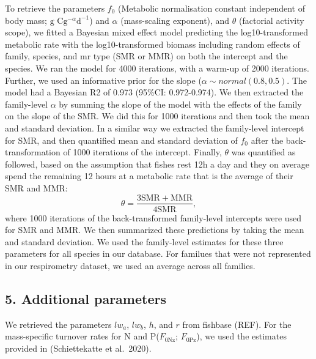 \documentclass[12pt,a4paper]{article}
\begin{document}
To retrieve the parameters \(f_\textrm{0}\) (Metabolic normalisation
constant independent of body mass;
\(\textrm{g C} \textrm{g}^{-\alpha} \textrm{d}^{-1}\)) and \(\alpha\)
(mass-scaling exponent), and \(\theta\) (factorial activity scope), we
fitted a Bayesian mixed effect model predicting the log10-transformed
metabolic rate with the log10-transformed biomass including random
effects of family, species, and mr type (SMR or MMR) on both the
intercept and the species. We ran the model for 4000 iterations, with a
warm-up of 2000 iterations. Further, we used an informative prior for
the slope (\(\alpha \sim normal(0.8, 0.5)\). The model had a Bayesian R2
of 0.973 (95\%CI: 0.972-0.974). We then extracted the family-level
\(\alpha\) by summing the slope of the model with the effects of the
family on the slope of the SMR. We did this for 1000 iterations and then
took the mean and standard deviation. In a similar way we extracted the
family-level intercept for SMR, and then quantified mean and standard
deviation of \(f_\textrm{0}\) after the back-transformation of 1000
iterations of the intercept. Finally, \(\theta\) was quantified as
followed, based on the assumption that fishes rest 12h a day and they on
average spend the remaining 12 hours at a metabolic rate that is the
average of their SMR and MMR: \begin{equation}
    \theta = \frac{3\textrm{SMR} + \textrm{MMR}}{4\textrm{SMR}},
    \label{theta}
\end{equation} where 1000 iterations of the back-transformed
family-level intercepts were used for SMR and MMR. We then summarized
these predictions by taking the mean and standard deviation. We used the
family-level estimates for these three parameters for all species in our
database. For familues that were not represented in our respirometry
dataset, we used an average across all families.

\hypertarget{additional-parameters}{%
\subsection{5. Additional parameters}\label{additional-parameters}}

We retrieved the parameters \(lw_a\), \(lw_b\), \(h\), and \(r\) from
fishbase (REF). For the mass-specific turnover rates for N and
P(\(F_\textrm{0Nz}\); \(F_\textrm{0Pz}\)), we used the estimates
provided in (Schiettekatte et al.~2020).
\end{document}
